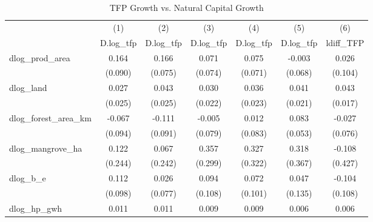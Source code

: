 \begin{table}[htbp]\centering
\def\sym#1{\ifmmode^{#1}\else\(^{#1}\)\fi}
\caption{TFP Growth vs. Natural Capital Growth}
\begin{tabular}{l*{6}{c}}
\hline\hline
            &\multicolumn{1}{c}{(1)}&\multicolumn{1}{c}{(2)}&\multicolumn{1}{c}{(3)}&\multicolumn{1}{c}{(4)}&\multicolumn{1}{c}{(5)}&\multicolumn{1}{c}{(6)}\\
            &\multicolumn{1}{c}{D.log\_tfp}&\multicolumn{1}{c}{D.log\_tfp}&\multicolumn{1}{c}{D.log\_tfp}&\multicolumn{1}{c}{D.log\_tfp}&\multicolumn{1}{c}{D.log\_tfp}&\multicolumn{1}{c}{ldiff\_TFP}\\
\hline
dlog\_prod\_area&       0.164       &       0.166       &       0.071       &       0.075       &      -0.003       &       0.026       \\
            &     (0.090)       &     (0.075)       &     (0.074)       &     (0.071)       &     (0.068)       &     (0.104)       \\
[1em]
dlog\_land   &       0.027       &       0.043       &       0.030       &       0.036       &       0.041       &       0.043       \\
            &     (0.025)       &     (0.025)       &     (0.022)       &     (0.023)       &     (0.021)       &     (0.017)       \\
[1em]
dlog\_forest\_area\_km&      -0.067       &      -0.111       &      -0.005       &       0.012       &       0.083       &      -0.027       \\
            &     (0.094)       &     (0.091)       &     (0.079)       &     (0.083)       &     (0.053)       &     (0.076)       \\
[1em]
dlog\_mangrove\_ha&       0.122       &       0.067       &       0.357       &       0.327       &       0.318       &      -0.108       \\
            &     (0.244)       &     (0.242)       &     (0.299)       &     (0.322)       &     (0.367)       &     (0.427)       \\
[1em]
dlog\_b\_e    &       0.112       &       0.026       &       0.094       &       0.072       &       0.047       &      -0.104       \\
            &     (0.098)       &     (0.077)       &     (0.108)       &     (0.101)       &     (0.135)       &     (0.108)       \\
[1em]
dlog\_hp\_gwh &       0.011       &       0.011       &       0.009       &       0.009       &       0.006       &       0.006       \\

\end{tabular}
\end{table}
